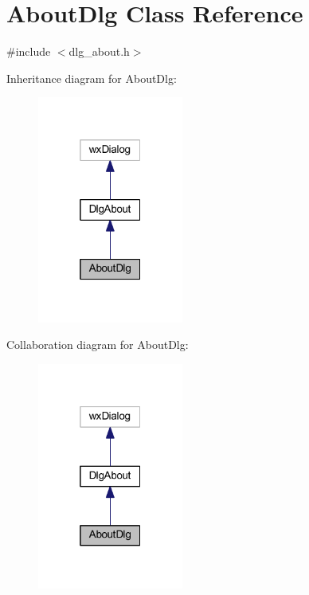 \hypertarget{class_about_dlg}{\section{About\-Dlg Class Reference}
\label{class_about_dlg}
}


{\ttfamily \#include $<$dlg\-\_\-about.\-h$>$}



Inheritance diagram for About\-Dlg\-:
\nopagebreak
\begin{figure}[H]
\begin{center}
\leavevmode
\includegraphics[width=136pt]{class_about_dlg__inherit__graph}
\end{center}
\end{figure}


Collaboration diagram for About\-Dlg\-:
\nopagebreak
\begin{figure}[H]
\begin{center}
\leavevmode
\includegraphics[width=136pt]{class_about_dlg__coll__graph}
\end{center}
\end{figure}
